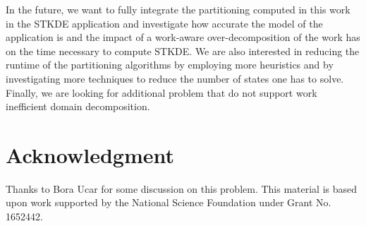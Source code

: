 \documentclass[10pt, conference, compsocconf]{IEEEtran}
\begin{document}
In the future, we want to fully integrate the partitioning computed in
this work in the STKDE application and investigate how accurate the
model of the application is and the impact of a work-aware
over-decomposition of the work has on the time necessary to compute
STKDE. We are also interested in reducing the runtime of the
partitioning algorithms by employing more heuristics and by
investigating more techniques to reduce the number of states one has
to solve. Finally, we are looking for additional problem that do not
support work inefficient domain decomposition.

\section*{Acknowledgment}
Thanks to Bora Ucar for some discussion on this problem. This material
is based upon work supported by the National Science Foundation under
Grant No. 1652442.



\end{document}
